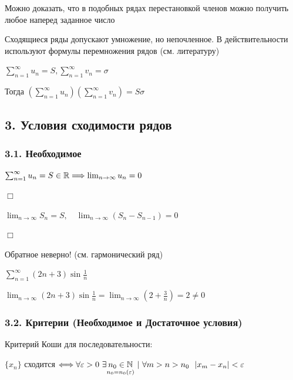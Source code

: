 \documentclass[12pt]{article}
\begin{document}
    \Notas Можно доказать, что в подобных рядах перестановкой членов можно получить любое наперед заданное число

    \Notas Сходящиеся ряды допускают умножение, но непочленное. В действительности используют формулы перемножения рядов (см. литературу)

    $\sum_{n = 1}^\infty u_n = S, \sum_{n = 1}^\infty v_n = \sigma$

    Тогда $\left(\sum_{n = 1}^\infty u_n\right)\left(\sum_{n = 1}^\infty v_n\right) = S\sigma$

    \mediumvspace

    \subsection{3. Условия сходимости рядов}

    \hypertarget{necessarycondition}{}

    \subsubsection{3.1. Необходимое}

    \begin{MyTheorem}
        \Ths $\sum_{n = 1}^\infty u_n = S \in \mathbb{R} \Longrightarrow \lim_{n \to \infty} u_n = 0$
    \end{MyTheorem}

    \begin{tcolorbox}
        $\Box$

        $\lim_{n \to \infty} S_n = S, \quad \lim_{n\to\infty} (S_n - S_{n - 1}) = 0$

        $\Box$
    \end{tcolorbox}

    \Nota Обратное неверно! (см. гармонический ряд)

    \Ex $\sum_{n = 1}^\infty (2n + 3) \sin \frac{1}{n}$

    $\lim_{n \to \infty} (2n + 3) \sin \frac{1}{n} = \lim_{n \to \infty} (2 + \frac{3}{n}) = 2 \neq 0$

    \subsubsection{3.2. Критерии (Необходимое и Достаточное условия)}

    \hypertarget{cauchycriteria}{}

    \Mem Критерий Коши для последовательности: 
    
    $\{x_n\}$ сходится $\Longleftrightarrow \forall \varepsilon > 0 \ \exists \underset{n_0 = n_0 (\varepsilon)}{n_0 \in \mathbb{N}} \ | \ \forall m > n > n_0 \ \ |x_m - x_n| < \varepsilon$
\end{document}
